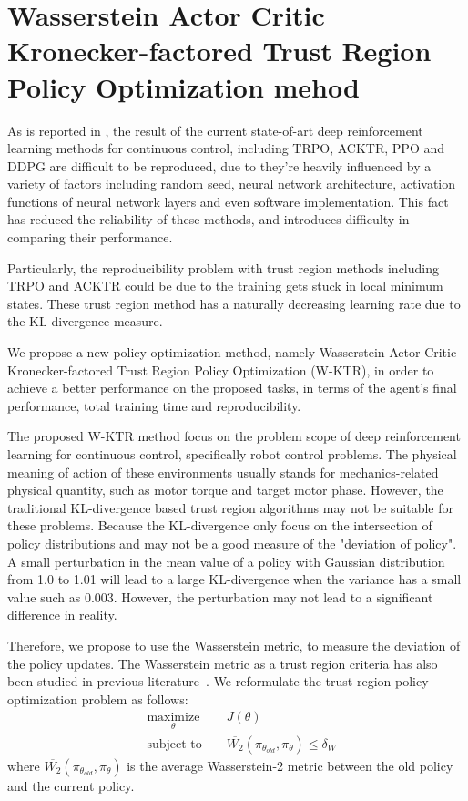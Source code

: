 \section{Wasserstein Actor Critic Kronecker-factored Trust Region Policy Optimization mehod }
As is reported in \cite{henderson2017matters}, the result of the current state-of-art deep reinforcement learning methods for continuous control, including TRPO, ACKTR, PPO and DDPG are difficult to be reproduced, due to they're heavily influenced by a variety of factors including random seed, neural network architecture, activation functions of neural network layers and even software implementation. This fact has reduced the reliability of these methods, and introduces difficulty in comparing their performance.

Particularly, the reproducibility problem with trust region methods including TRPO and ACKTR could be due to the training gets stuck in local minimum states. These trust region method has a naturally decreasing learning rate due to the KL-divergence measure. 

We propose a new policy optimization method, namely Wasserstein Actor Critic Kronecker-factored Trust Region Policy Optimization (W-KTR), in order to achieve a better performance on the proposed tasks, in terms of the agent's final performance, total training time and reproducibility.

The proposed W-KTR method focus on the problem scope of deep reinforcement learning for continuous control, specifically robot control problems. The physical meaning of action of these environments usually stands for mechanics-related physical quantity, such as motor torque and target motor phase. However, the traditional KL-divergence based trust region algorithms may not be suitable for these problems. Because the KL-divergence only focus on the intersection of policy distributions and may not be a good measure of the "deviation of policy". A small perturbation in the mean value of a policy with Gaussian distribution from 1.0 to 1.01 will lead to a large KL-divergence when the variance has a small value such as 0.003. However, the perturbation may not lead to a significant difference in reality.

Therefore, we propose to use the Wasserstein metric, to measure the deviation of the policy updates. The Wasserstein metric as a trust region criteria has also been studied in previous literature~\cite{tolstikhin2017wasserstein}. We reformulate the trust region policy optimization problem as follows:
\begin{equation}
    \begin{aligned}
&    \underset{\theta}{\text{maximize}} 
&& J(\theta) \\
& \text{subject to } 
&& \overline{W_2}(\pi_{\theta_{old}},\pi_\theta) \leq \delta_{W}\end{aligned}
\end{equation}
where $ \overline{W_2}(\pi_{\theta_{old}},\pi_\theta)$ is the average Wasserstein-2 metric between the old policy and the current policy.

